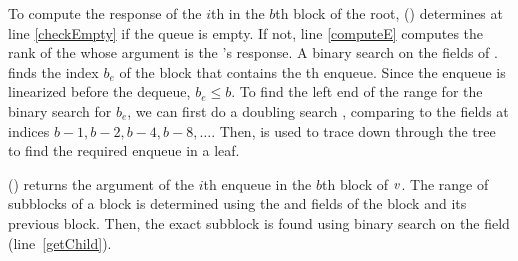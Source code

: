 To compute the response of the $i$th  in the $b$th block
of the root, () determines at line \ref{checkEmpty} if the queue is empty.
If not, line \ref{computeE} computes the rank  of the
 whose argument is the 's response. 
A binary search on the  fields of . finds the index $b_e$ of the block that contains 
the th enqueue.
Since the enqueue is linearized before the dequeue, $b_e\leq b$.  To find the left end of the range for the binary search for $b_e$, we can first do a doubling search \cite{BY76}, comparing  to the  fields at indices $b-1, b-2, b-4, b-8, \ldots$.
Then,  is used to trace down through the tree to find the required enqueue in a leaf.

() returns the argument of the
$i$th enqueue in the $b$th block of  $\mbox{\textnormal{\textit{v}}}$. 
The range of subblocks of a block is determined using the  and
 fields of the block and its previous block. Then,
the exact subblock is found using binary search on the 
field (line~\ref{getChild}). 



